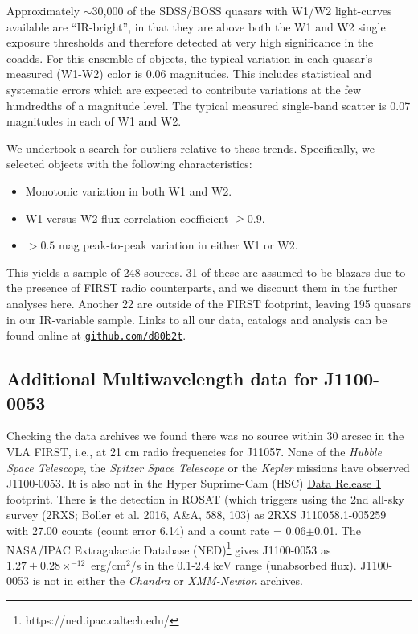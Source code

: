 \documentclass[11pt,a4paper]{article}
\begin{document}
Approximately $\sim$30,000 of the SDSS/BOSS quasars with W1/W2 light-curves available are ``IR-bright'', in that they are above both the W1 and W2 single exposure thresholds and therefore detected at very high significance in the coadds. For this ensemble of objects, the typical variation in each quasar's measured (W1-W2) color is 0.06 magnitudes.  This includes statistical and systematic errors which are expected to contribute variations at the few hundredths of a magnitude level. The typical measured single-band scatter is 0.07 magnitudes in each of W1 and W2.

We undertook a search for outliers relative to these trends. Specifically, we selected objects with the following characteristics:
\begin{itemize}
    \item Monotonic variation in both W1 and W2.
    \item W1 versus W2 flux correlation coefficient $\geq0.9$.
    \item $>0.5$ mag peak-to-peak variation in either W1 or W2.
\end{itemize}
This yields a sample of 248 sources. 31 of these are assumed to be blazars due to the presence of FIRST radio counterparts, and we discount them in the further analyses here. Another 22 are outside of the FIRST footprint, leaving 195 quasars in our IR-variable sample. Links to all our data, catalogs and analysis can be found online at \href{https://github.com/d80b2t}{{\tt github.com/d80b2t}}.


\subsection*{Additional Multiwavelength data for J1100-0053}
Checking the data archives we found there was no source within 30
arcsec in the VLA FIRST, i.e., at 21 cm radio frequencies for J11057.
None of the {\it Hubble Space Telescope}, the {\it Spitzer Space
Telescope} or the {\it Kepler} missions have observed J1100-0053.  It is
also not in the Hyper Suprime-Cam (HSC)
\href{https://hsc-release.mtk.nao.ac.jp/doc/}{Data Release 1}
\citep{Aihara2017} footprint. There is the detection in ROSAT (which
triggers using the 2nd all-sky survey (2RXS; Boller et al. 2016, A\&A,
588, 103) as 2RXS J110058.1-005259 with 27.00 counts (count error
6.14) and a count rate = 0.06$\pm$0.01. The  NASA/IPAC Extragalactic Database 
(NED)\footnote{https://ned.ipac.caltech.edu/} gives J1100-0053 as
$1.27\pm0.28 \times^{-12}$ erg/cm$^{2}$/s in the 0.1-2.4 keV range
(unabsorbed flux). J1100-0053 is not in either the {\it Chandra} or {\it
XMM-Newton} archives. 
\end{document}
